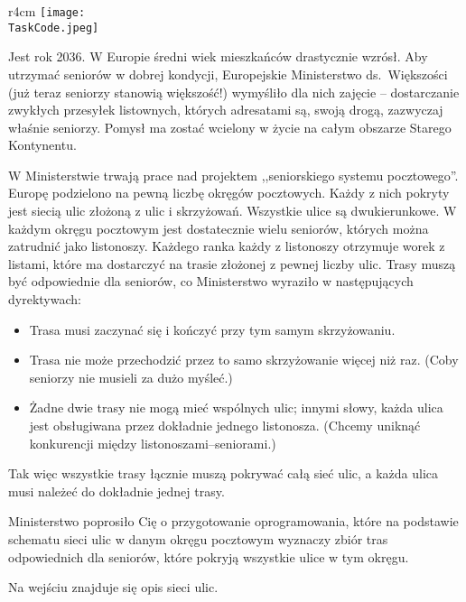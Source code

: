 \documentclass{boi2014-pl}
\renewcommand{\TaskCode}{postmen}
\begin{document}
    \begin{wrapfigure}[8]{r}{4cm}
        \vspace{-18pt}
		\texttt{[image: \\TaskCode.jpeg]}
	\end{wrapfigure}
    Jest rok 2036.
    W Europie średni wiek mieszkańców drastycznie wzrósł.
    Aby utrzymać seniorów w dobrej kondycji, Europejskie Ministerstwo ds.\ Większości
    (już teraz seniorzy stanowią większość!) wymyśliło dla nich zajęcie -- dostarczanie
    zwykłych przesyłek listownych, których adresatami są, swoją drogą, zazwyczaj właśnie seniorzy.
    Pomysł ma zostać wcielony w życie na całym obszarze Starego Kontynentu.

    W Ministerstwie trwają prace nad projektem ,,seniorskiego systemu pocztowego''.
    Europę podzielono na pewną liczbę okręgów pocztowych.
    Każdy z nich pokryty jest siecią ulic złożoną z ulic i skrzyżowań.
    Wszystkie ulice są dwukierunkowe.
    W każdym okręgu pocztowym jest dostatecznie wielu seniorów, których można zatrudnić
    jako listonoszy.
    Każdego ranka każdy z listonoszy otrzymuje worek z listami, które ma dostarczyć
    na trasie złożonej z pewnej liczby ulic.
    Trasy muszą być odpowiednie dla seniorów, co Ministerstwo wyraziło
    w następujących dyrektywach:

    \begin{itemize}
        \item Trasa musi zaczynać się i kończyć przy tym samym skrzyżowaniu.
        \item Trasa nie może przechodzić przez to samo skrzyżowanie więcej niż raz.
          (Coby seniorzy nie musieli za dużo myśleć.)
        \item Żadne dwie trasy nie mogą mieć wspólnych ulic;
          innymi słowy, każda ulica jest obsługiwana przez
          dokładnie jednego listonosza.
          (Chcemy uniknąć konkurencji między listonoszami--seniorami.)
    \end{itemize}

    Tak więc wszystkie trasy łącznie muszą pokrywać całą sieć ulic, a każda ulica musi należeć
    do dokładnie jednej trasy.

    \Task
    Ministerstwo poprosiło Cię o przygotowanie oprogramowania, które
    na podstawie schematu sieci ulic w danym okręgu pocztowym wyznaczy zbiór tras
    odpowiednich dla seniorów, które pokryją wszystkie ulice w tym okręgu.

    \Input
    Na wejściu znajduje się opis sieci ulic.
\end{document}
